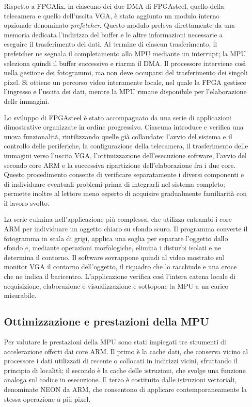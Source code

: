 \documentclass[a4paper,12pt]{article}
\begin{document}
Rispetto a FPGAlix, in ciascuno dei due DMA di FPGAsteel, quello della telecamera e quello dell'uscita VGA, è stato aggiunto un modulo interno opzionale denominato \emph{prefetcher}. Questo modulo preleva direttamente da una memoria dedicata l'indirizzo del buffer e le altre informazioni necessarie a eseguire il trasferimento dei dati. Al termine di ciascun trasferimento, il prefetcher ne segnala il completamento alla MPU mediante un interrupt; la MPU seleziona quindi il buffer successivo e riarma il DMA. Il processore interviene così nella gestione dei fotogrammi, ma non deve occuparsi del trasferimento dei singoli pixel. Si ottiene un percorso video interamente locale, nel quale la FPGA gestisce l'ingresso e l'uscita dei dati, mentre la MPU rimane disponibile per l'elaborazione delle immagini.

Lo sviluppo di FPGAsteel è stato accompagnato da una serie di applicazioni dimostrative organizzate in ordine progressivo. Ciascuna introduce e verifica una nuova funzionalità, riutilizzando quelle già collaudate: l'avvio del sistema e il controllo delle periferiche, la configurazione della telecamera, il trasferimento delle immagini verso l'uscita VGA, l'ottimizzazione dell'esecuzione software, l'avvio del secondo core ARM e la successiva ripartizione dell'elaborazione fra i due core. Questo procedimento consente di verificare separatamente i diversi componenti e di individuare eventuali problemi prima di integrarli nel sistema completo; permette inoltre al lettore meno esperto di acquisire gradualmente familiarità con il lavoro svolto.

La serie culmina nell'applicazione più complessa, che utilizza entrambi i core ARM per individuare un oggetto chiaro su sfondo scuro. Il programma converte il fotogramma in scala di grigi, applica una soglia per separare l'oggetto dallo sfondo e, mediante operazioni morfologiche, elimina i disturbi isolati e ne determina il contorno. Il software sovrappone quindi al video mostrato sul monitor VGA il contorno dell'oggetto, il riquadro che lo racchiude e una croce che ne indica il baricentro. L'applicazione verifica così l'intera catena locale di acquisizione, elaborazione e visualizzazione e sottopone la MPU a un carico misurabile.

\subsection{Ottimizzazione e prestazioni della MPU}

Per valutare le prestazioni della MPU sono stati impiegati tre strumenti di accelerazione offerti dai core ARM. Il primo è la cache dati, che conserva vicino al processore i dati utilizzati di recente o collocati in indirizzi vicini, sfruttando il principio di località; il secondo è la cache delle istruzioni, che svolge una funzione analoga sul codice in esecuzione. Il terzo è costituito dalle istruzioni vettoriali, denominate NEON da ARM, che consentono di applicare contemporaneamente la stessa operazione a più pixel.
\end{document}
